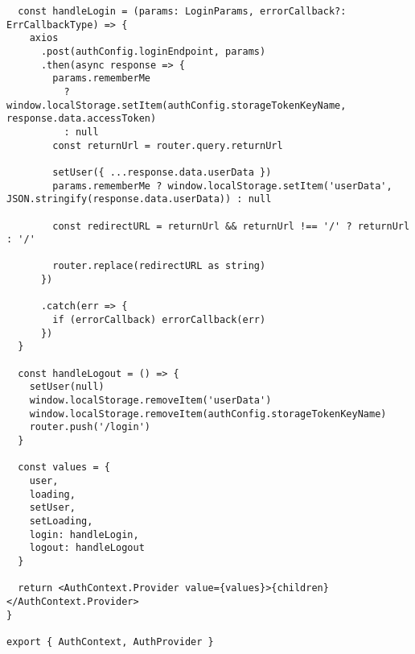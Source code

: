 \begin{verbatim}
  const handleLogin = (params: LoginParams, errorCallback?: ErrCallbackType) => {
    axios
      .post(authConfig.loginEndpoint, params)
      .then(async response => {
        params.rememberMe
          ? window.localStorage.setItem(authConfig.storageTokenKeyName, response.data.accessToken)
          : null
        const returnUrl = router.query.returnUrl

        setUser({ ...response.data.userData })
        params.rememberMe ? window.localStorage.setItem('userData', JSON.stringify(response.data.userData)) : null

        const redirectURL = returnUrl && returnUrl !== '/' ? returnUrl : '/'

        router.replace(redirectURL as string)
      })

      .catch(err => {
        if (errorCallback) errorCallback(err)
      })
  }

  const handleLogout = () => {
    setUser(null)
    window.localStorage.removeItem('userData')
    window.localStorage.removeItem(authConfig.storageTokenKeyName)
    router.push('/login')
  }

  const values = {
    user,
    loading,
    setUser,
    setLoading,
    login: handleLogin,
    logout: handleLogout
  }

  return <AuthContext.Provider value={values}>{children}</AuthContext.Provider>
}

export { AuthContext, AuthProvider }
\end{verbatim}




